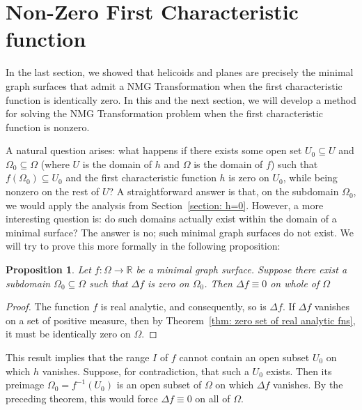 \documentclass[12pt]{article}
\theoremstyle{plain}
\newtheorem{proposition}[theorem]{Proposition}
\theoremstyle{definition}
\theoremstyle{remark}
\begin{document}
  \section{Non-Zero First Characteristic function} 
  
  In the last section, we showed that helicoids and planes are precisely the minimal graph surfaces that admit a NMG Transformation when the first characteristic function is identically zero. In this and the next section, we will develop a method for solving the NMG Transformation problem when the first characteristic function is nonzero.
  
  A natural question arises: what happens if there exists some open set \(U_0 \subseteq U\) and \(\Omega_0 \subseteq \Omega\) (where \(U\) is the domain of \(h\) and \(\Omega\) is the domain of \(f\)) such that \(f(\Omega_0) \subseteq U_0\) and the first characteristic function \(h\) is zero on \(U_0\), while being nonzero on the rest of \(U\)? A straightforward answer is that, on the subdomain \(\Omega_0\), we would apply the analysis from Section~\ref{section: h=0}. However, a more interesting question is: do such domains actually exist within the domain of a minimal surface? The answer is no; such minimal graph surfaces do not exist. We will try to prove this more formally in the following proposition:
  
  \begin{proposition}
  	\label{thm: h is non zero every where}
  	Let \(f:\Omega\longrightarrow\mathbb{R}\) be a minimal graph surface. Suppose there exist a subdomain \(\Omega_0\subseteq\Omega\) such that \(\Delta f\) is zero on \(\Omega_0\). Then \(\Delta f\equiv 0\) on whole of \(\Omega\)
  \end{proposition}
  
  \begin{proof}
  	The function \(f\) is real analytic, and consequently, so is \(\Delta f\). If \(\Delta f\) vanishes on a set of positive measure, then by Theorem~\ref{thm: zero set of real analytic fns}, it must be identically zero on \(\Omega\).
  \end{proof}
  
  This result implies that the range \(I\) of \(f\) cannot contain an open subset \(U_0\) on which \(h\) vanishes. Suppose, for contradiction, that such a \(U_0\) exists. Then its preimage \(\Omega_0 = f^{-1}(U_0)\) is an open subset of \(\Omega\) on which \(\Delta f\) vanishes. By the preceding theorem, this would force \(\Delta f \equiv 0\) on all of \(\Omega\).
  
\end{document}
